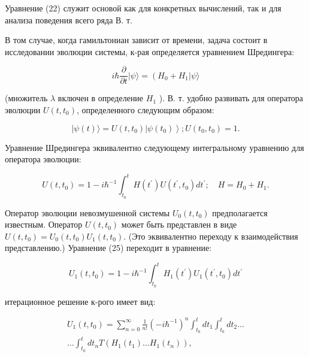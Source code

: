 \documentclass[10pt]{article}
\begin{document}
Уравнение (22) служит основой как для конкретных вычислений, так и для анализа поведения всего ряда В. т.



В том случае, когда гамильтониан зависит от времени, задача состоит в исследовании эволюции системы, к-рая определяется уравнением Шредингера:



\[

i \hbar \frac{\partial}{\partial t}|\psi\rangle=\left(H_{0}+H_{1}|\psi\rangle\right.

\]



(множитель $\lambda$ включен в определение $H_{1}$ ). В. т. удобно развивать для оператора эволюции $U\left(t, t_{0}\right)$, определенного следующим образом:



\[

|\psi(t)\rangle=U\left(t, t_{0}\right)\left|\psi\left(t_{0}\right)\right\rangle ; U\left(t_{0}, t_{0}\right)=1 .

\]



Уравнение Шредингера эквивалентно следующему интегральному уравнению для оператора эволюции:



\[

U\left(t, t_{0}\right)=1-i \hbar^{-1} \int_{t_{0}}^{t} H\left(t^{\prime}\right) U\left(t^{\prime}, t_{0}\right) d t^{\prime} ; \quad H=H_{0}+H_{1} .

\]



Оператор эволюции невозмушенной системы $U_{0}\left(t, t_{0}\right)$ предполагается известным. Оператор $U\left(t, t_{0}\right)$ может быть представлен в виде $U\left(t, t_{0}\right)=U_{0}\left(t, t_{0}\right) U_{1}\left(t, t_{0}\right)$. (Это эквивалентно переходу к взаимодействия представлению.) Уравнение (25) переходит в уравнение:



\[

U_{1}\left(t, t_{0}\right)=1-i \hbar^{-1} \int_{t_{0}}^{t} H_{1}\left(t^{\prime}\right) U_{1}\left(t^{\prime}, t_{0}\right) d t^{\prime}

\]



итерационное решение к-рого имеет вид:



\[

\begin{gathered}

U_{1}\left(t, t_{0}\right)=\sum_{n=0}^{\infty} \frac{1}{n !}\left(-i \hbar^{-1}\right)^{n} \int_{t_{0}}^{t} d t_{1} \int_{t_{0}}^{t} d t_{2} \ldots \\

\ldots \int_{t_{0}}^{t} d t_{n} T\left(H_{1}\left(t_{1}\right) \ldots H_{1}\left(t_{n}\right)\right),

\end{gathered}

\]
\end{document}
